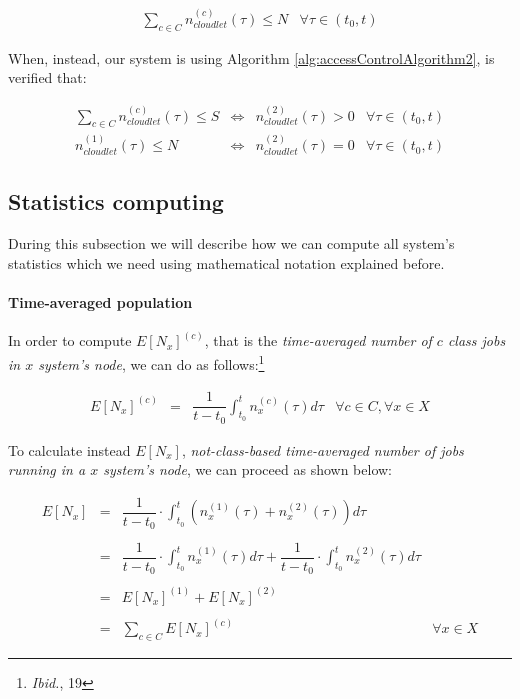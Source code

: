 \documentclass[10pt,a4paper]{article}
\begin{document}
\begin{equation}
\begin{array} {lr} 
\displaystyle \sum_{c \in C} n_{cloudlet}^{(c)}(\tau) \leq N & \forall \tau \in (t_0, t)
\end{array}
\end{equation}

When, instead, our system is using Algorithm \ref{alg:accessControlAlgorithm2}, is verified that:

\begin{equation}
\begin{array} {rccr} 
\displaystyle \sum_{c \in C} n_{cloudlet}^{(c)}(\tau) \leq S & \Leftrightarrow & n_{cloudlet}^{(2)}(\tau) > 0 & \forall \tau \in (t_0, t) \\
n_{cloudlet}^{(1)}(\tau) \leq N & \Leftrightarrow & n_{cloudlet}^{(2)}(\tau) = 0 & \forall \tau \in (t_0, t)
\end{array}
\end{equation}

\subsection{Statistics computing}

During this subsection we will describe how we can compute all system's statistics which we need using mathematical notation explained before.

\paragraph{Time-averaged population}

In order to compute $E[N_x]^{(c)}$, that is the \textit{time-averaged number of $c$ class jobs in $x$ system's node}, we can do as follows:\footnote{\textit{Ibid.}, 19}

\begin{equation}
\begin{array} {rclr} 
E[N_x]^{(c)} & = & \displaystyle  \dfrac{1}{t-t_0}\int_{t_0}^t n_x^{(c)}(\tau)d\tau & \forall c \in C, \forall x \in X
\end{array}
\end{equation}

To calculate instead $E[N_x]$, \textit{not-class-based time-averaged number of jobs running in a $x$ system's node}, we can proceed as shown below:

\begin{equation}
\begin{array} {rclr} 
E[N_x] & = & \displaystyle  \dfrac{1}{t-t_0} \cdot \int_{t_0}^t \left( n_x^{(1)}(\tau) + n_x^{(2)}(\tau) \right) d\tau \\\\
	   & = & \displaystyle  \dfrac{1}{t-t_0} \cdot \int_{t_0}^t n_x^{(1)}(\tau)d\tau + \dfrac{1}{t-t_0} \cdot \int_{t_0}^t n_x^{(2)}(\tau)d\tau \\\\
	   & = & E[N_x]^{(1)} + E[N_x]^{(2)} \\\\
	   & = & \displaystyle  \sum_{c \in C} E[N_x]^{(c)} & \forall x \in X
\end{array}
\end{equation}
\end{document}
